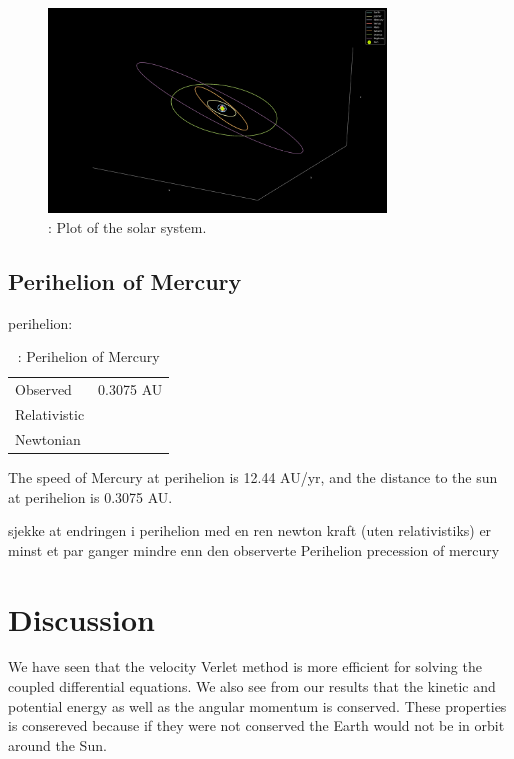 \documentclass{article}
\begin{document}
\begin{figure}[H]
    \begin{center}
        \includegraphics[width=0.8\textwidth]{./Plot/Solar_System.png}
        \caption{: Plot of the solar system.}
        \label{fig:solar}
    \end{center}
\end{figure}


\subsection{Perihelion of Mercury}
perihelion:

\begin{table}[h!]
    \caption{: Perihelion of Mercury}
    \label{tab:perihelion}
    \centering
    \begin{tabular}{l c}
        \hline
        Observed    &       0.3075 AU\\
        Relativistic    &   \\
        Newtonian   &  \\
        \hline
    \end{tabular}
\end{table}
The speed of Mercury at perihelion is 12.44 AU/yr, and the distance to the sun at perihelion is 0.3075 AU.

sjekke at endringen i perihelion med en ren newton kraft (uten relativistiks) er minst et par ganger mindre enn den observerte Perihelion precession of mercury

\section{Discussion}
We have seen that the velocity Verlet method is more efficient for solving the coupled differential equations. We also see from our results that the kinetic and potential energy as well as the angular momentum is conserved.
These properties is consereved because if they were not conserved the Earth would not be in orbit around the Sun.
\end{document}
